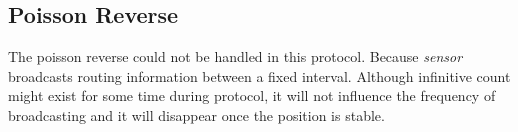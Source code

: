 \documentclass[a4paper]{article}
\begin{document}
\subsection{Poisson Reverse}
The poisson reverse could not be handled in this protocol. Because \emph{sensor} broadcasts routing information between a fixed interval. Although infinitive count might exist for some time during protocol, it will not influence the frequency of broadcasting and it will disappear once the position is stable.
\end{document}
